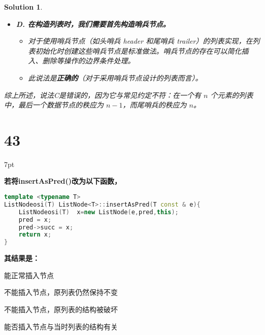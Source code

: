 \documentclass[UTF8]{report}
\newtheorem{solution}{Solution}
\theoremstyle{MyLineTheoremStyle} %
\theoremstyle{MyBlockTheoremStyle} %
\theoremstyle{MySubsubsectionStyle} %
\newenvironment{graybox}{%
        \def\FrameCommand{%
        \hspace{1pt}%
        {\color{gray}\small \vrule width 2pt}%
        {\color{graybox_color}\vrule width 4pt}%
        \colorbox{graybox_color}%
        }%
        \MakeFramed{\advance\hsize-\width\FrameRestore}%
        \noindent\hspace{-4.55pt}%
        \begin{adjustwidth}{}{7pt}%
        \vspace{2pt}\vspace{2pt}%
        }
        {%
        \vspace{2pt}\end{adjustwidth}\endMakeFramed%
        }
\begin{document}
\begin{solution}
\begin{itemize}
    \item \textbf{D. 在构造列表时，我们需要首先构造哨兵节点。}
    \begin{itemize}
        \item 对于使用哨兵节点（如头哨兵 header 和尾哨兵 trailer）的列表实现，在列表初始化时创建这些哨兵节点是标准做法。哨兵节点的存在可以简化插入、删除等操作的边界条件处理。
        \item 此说法是\textbf{正确的}（对于采用哨兵节点设计的列表而言）。
    \end{itemize}
\end{itemize}
综上所述，说法C是错误的，因为它与常见约定不符：在一个有 $n$ 个元素的列表中，最后一个数据节点的秩应为 $n-1$，而尾哨兵的秩应为 $n$。
\end{solution}


\section*{43}

\begin{graybox}
\textbf{若将insertAsPred()改为以下函数，}
\begin{lstlisting}[language=C++, basicstyle=\ttfamily\small, columns=flexible]
template <typename T>
ListNodeosi(T) ListNode<T>::insertAsPred(T const & e){
    ListNodeosi(T)  x=new ListNode(e,pred,this);
    pred = x; 
    pred->succ = x;
    return x;
}
\end{lstlisting}
\textbf{其结果是：}
\begin{circledenum}
    \item 能正常插入节点
    \item 不能插入节点，原列表仍然保持不变
    \item 不能插入节点，原列表的结构被破坏
    \item 能否插入节点与当时列表的结构有关
\end{circledenum}
\end{graybox}
\end{document}
